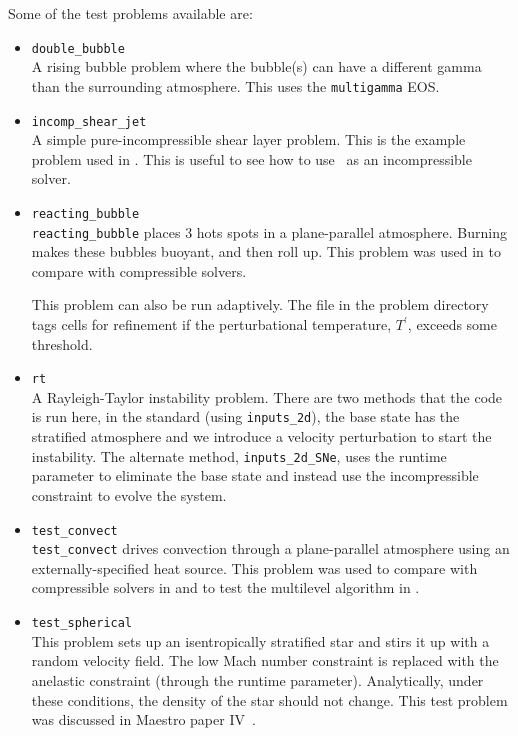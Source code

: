 Some of the test problems available are:
\begin{itemize}
\item {\tt double\_bubble} \\[-3mm]

A rising bubble problem where the bubble(s) can have a different gamma
than the surrounding atmosphere.  This uses the {\tt multigamma} EOS.

\item {\tt incomp\_shear\_jet} \\[-3mm]

A simple pure-incompressible shear layer problem.  This is the example
problem used in \cite{bellcolellaglaz}.  This is useful to see how to
use \maestroex\ as an incompressible solver.

\item {\tt reacting\_bubble} \\[-3mm]

{\tt reacting\_bubble} places 3 hots spots in a plane-parallel atmosphere.
Burning makes these bubbles buoyant, and then roll up.  This problem was
used in \cite{lowMach3} to compare with compressible solvers.

This problem can also be run adaptively.  The 
file in the problem directory tags cells for refinement if the
perturbational temperature, $T^\prime$, exceeds some threshold.  

\item {\tt rt} \\ [-3mm]

A Rayleigh-Taylor instability problem.  There are two methods that the
code is run here, in the standard (using {\tt inputs\_2d}), the base state
has the stratified atmosphere and we introduce a velocity perturbation
to start the instability.  The alternate method, {\tt inputs\_2d\_SNe}, uses
the  runtime parameter to eliminate the base state
and instead use the incompressible constraint to evolve the system.

\item {\tt test\_convect} \\[-3mm]

{\tt test\_convect} drives convection through a plane-parallel
atmosphere using an externally-specified heat source.  This problem
was used to compare with compressible solvers in \cite{lowMach3}
and to test the multilevel algorithm in \cite{multilevel}.

\item {\tt test\_spherical} \\[-3mm]

This problem sets up an isentropically stratified star and stirs it up
with a random velocity field.  The low Mach number constraint is
replaced with the anelastic constraint (through
the  runtime parameter).  Analytically, under
these conditions, the density of the star should not change.  This
test problem was discussed in Maestro paper IV~\cite{lowMach4}.


\end{itemize}


